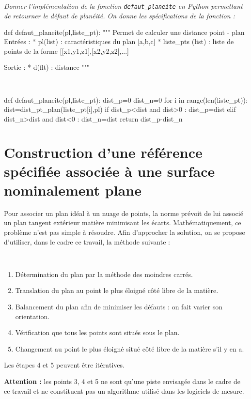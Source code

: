 \documentclass[10pt,fleqn]{article} %
\begin{document}
\subparagraph{}
\textit{Donner l'implémentation de la fonction \texttt{defaut\_planeite} en Python permettant de retourner le défaut de planéité. On donne les spécifications de la fonction : }
\begin{py}
\begin{python} 
def defaut_planeite(pl,liste_pt):
    """
    Permet de calculer une distance point - plan
    Entrées : 
        * pl(list) : caractéristiques du plan [a,b,c]
        * liste_pts (list) : liste de points de la forme [[x1,y1,z1],[x2,y2,z2],...]
        
    Sortie : 
        * d(flt) : distance
    """
\end{python}
\end{py}
\ifprof
\begin{corrige}~\\
\begin{python}
def defaut_planeite(pl,liste_pt):
    dist_p=0
    dist_n=0
    for i in range(len(liste_pt)):
        dist=dist_pt_plan(liste_pt[i],pl)
        if dist_p<dist and dist>0 :
            dist_p=dist
        elif dist_n>dist and dist<0 :
            dist_n=dist
    return dist_p-dist_n
\end{python}
\end{corrige}
\else
\fi

\section{Construction d'une référence spécifiée associée à une surface nominalement plane}

\ifprof
\else

Pour associer un plan idéal à un nuage de points, la norme prévoit de lui associé un plan tangent extérieur matière minimisant les écarts. Mathématiquement, ce problème n'est pas simple à résoudre. Afin d'approcher la solution, on se propose d'utiliser, dans le cadre ce travail,  la méthode suivante : 

\begin{methode}
~\\
\begin{enumerate}
\item Détermination du plan par la méthode des moindres carrés.
\item Translation du plan au point le plus éloigné côté libre de la matière.
\item Balancement du plan afin de minimiser les défauts : on fait varier son orientation.
\item Vérification que tous les points sont situés sous le plan.
\item Changement au point le plus éloigné situé côté libre de la matière s'il y en a.
\end{enumerate}
Les étapes 4 et 5 peuvent être itératives.
\begin{warn}
\textbf{\textsf{Attention :}} les points 3, 4 et 5 ne sont qu'une piste envisagée dans le cadre de ce travail et ne constituent pas un algorithme utilisé dans les logiciels de mesure.
\end{warn}
\end{methode}
\end{document}
